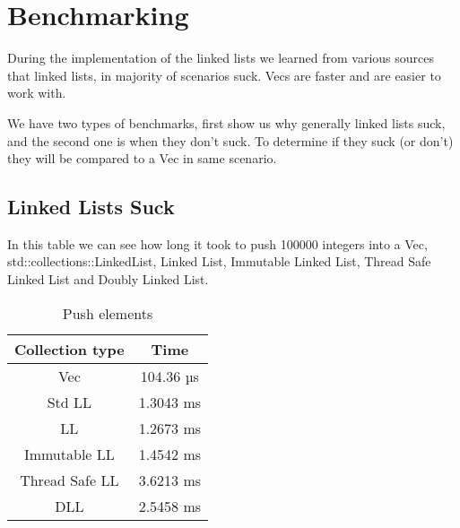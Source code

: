 \documentclass[11pt,twoside,a4paper]{article}
\begin{document}
\section{Benchmarking}

During the implementation of the linked lists we learned from various sources
that linked lists, in majority of scenarios suck\cite{rustunofficialIntroductionLearning}.
Vecs are faster and are easier to work with.

We have two types of benchmarks, first show us why generally linked lists suck,
and the second one is when they don't suck. To determine if they suck (or don't)
they will be compared to a Vec in same scenario.

\pagebreak
\subsection*{Linked Lists Suck}

In this table we can see how long it took to push 100000 integers into a Vec,\\
std::collections::LinkedList, Linked List, Immutable Linked List, Thread Safe
Linked List and Doubly Linked List.
\begin{table}[!h]
      \begin{center}
            \caption{Push elements}
            \begin{tabular}{|c|c|}
                  \hline
                  Collection type & Time      \\
                  \hline
                  Vec             & 104.36 µs \\
                  Std LL          & 1.3043 ms \\
                  LL              & 1.2673 ms \\
                  Immutable LL    & 1.4542 ms \\
                  Thread Safe LL  & 3.6213 ms \\
                  DLL             & 2.5458 ms \\
                  \hline
            \end{tabular}
      \end{center}
\end{table}
\end{document}
